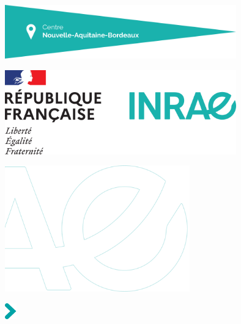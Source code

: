 \makeatletter
\let\inserttitle\@title
\makeatother
\makeatletter
\let\insertauthor\@author
\makeatother
\makeatletter
\let\insertdate\@date
\makeatother


\vspace*{-4.5cm}

%

\vspace*{12.15cm}

\hspace{-2.7cm}
\includegraphics[width=10cm]{templates/cartouche}\par

\hspace{12cm}
\includegraphics[width=10cm]{templates/bloc-etat}\par

\vspace*{-2cm}

\hspace{-2.8cm}
\includegraphics[width=8cm]{templates/sigle-inrae}

\vspace*{1cm}

\hspace{-1cm}
\setlength{\parindent}{0cm}
\includegraphics[width=0.5cm]{templates/fleche-titre}\hspace{0.3cm}\textcolor{inrae}{\sffamily\Huge\bfseries \inserttitle}\par\bigskip

